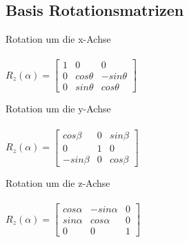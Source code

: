 \subsection{Basis Rotationsmatrizen}
	\begin {minipage}{7cm}
		Rotation um die x-Achse\\ \\
   		$R_z(\alpha)=\begin{bmatrix}
                		1 &0 &0\\
                		0 &cos\theta &-sin\theta\\
                		0 &sin\theta &cos\theta
                	 \end{bmatrix}$
    \end{minipage}
	\begin{minipage}{7cm}
    	Rotation um die y-Achse\\ \\
   		$R_z(\alpha)=\begin{bmatrix}
                		cos\beta &0 &sin\beta\\
                		0 &1 &0\\
                		-sin\beta &0 &cos\beta
                	 \end{bmatrix}$
    \end{minipage}
	\begin{minipage}{7cm}
    	Rotation um die z-Achse\\ \\
   		$R_z(\alpha)=\begin{bmatrix}
                		cos\alpha &-sin\alpha &0\\
                		sin\alpha &cos\alpha &0\\
                		0 &0 &1
                	 \end{bmatrix}$
    \end{minipage}


